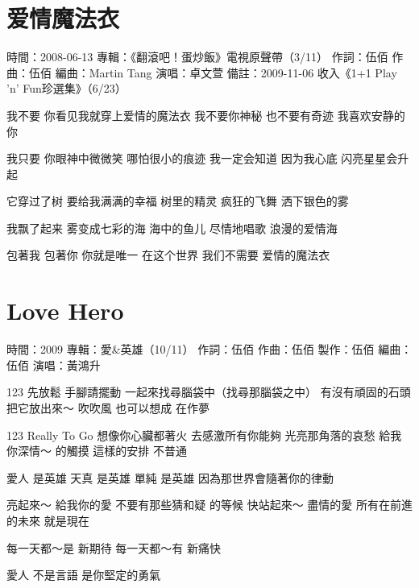 \documentclass[UTF8,a4paper,oneside,twocolumn,12pt]{ctexbook}
\newcommand{\infopair}[2]{\textbullet #1：#2}
\newcommand{\zc}[1][伍佰]{\infopair{作詞}{#1}}
\newcommand{\zq}[1][伍佰]{\infopair{作曲}{#1}}
\newcommand{\bq}[1][伍佰]{\infopair{編曲}{#1}}
\newcommand{\zj}[1]{\infopair{專輯}{#1}}
\newcommand{\zz}[1]{\infopair{製作}{#1}}
\newcommand{\sj}[1]{\infopair{時間}{#1}}
\newcommand{\bz}[1]{\infopair{備註}{#1}}
\newenvironment{info}{\begin{flushleft}\kaishu
	}
	{\end{flushleft}\normalsize\yahei\par}
\newenvironment{lyric}{
	}
{}
\begin{document}
\section{爱情魔法衣}
\begin{info}
	\sj{2008-06-13}
	\zj{《翻滾吧！蛋炒飯》電視原聲帶（3/11）}
	\zc
	\zq
	\bq[Martin Tang]
	\infopair{演唱}{卓文萱}
	\bz{2009-11-06 收入《1+1 Play 'n' Fun珍選集》（6/23）}
\end{info}
\begin{lyric}
	我不要 你看见我就穿上爱情的魔法衣
	我不要你神秘 也不要有奇迹 我喜欢安静的你

	我只要 你眼神中微微笑 哪怕很小的痕迹
	我一定会知道 因为我心底 闪亮星星会升起

	它穿过了树 要给我满满的幸福
	树里的精灵 疯狂的飞舞 洒下银色的雾

	我飘了起来 雾变成七彩的海
	海中的鱼儿 尽情地唱歌 浪漫的爱情海

	包著我 包著你 你就是唯一
	在这个世界 我们不需要 爱情的魔法衣
\end{lyric}

\section{Love Hero}
\begin{info}
	\sj{2009}
	\zj{愛\&英雄（10/11）}
	\zc
	\zq
	\zz{伍佰}
	\bq[伍佰]
	\infopair{演唱}{黃鴻升}
\end{info}
\begin{lyric}
	123 先放鬆 手腳請擺動
	一起來找尋腦袋中（找尋那腦袋之中） 有沒有頑固的石頭
	把它放出來～ 吹吹風
	也可以想成 在作夢

	123 Really To Go 想像你心臟都著火
	去感激所有你能夠 光亮那角落的哀愁
	給我你深情～ 的觸摸
	這樣的安排 不普通

	愛人 是英雄 天真 是英雄 單純 是英雄
	因為那世界會隨著你的律動

	亮起來～ 給我你的愛
	不要有那些猜和疑 的等候
	快站起來～ 盡情的愛
	所有在前進的未來 就是現在

	每一天都～是 新期待
	每一天都～有 新痛快

	愛人 不是言語 是你堅定的勇氣
\end{lyric}
\end{document}
